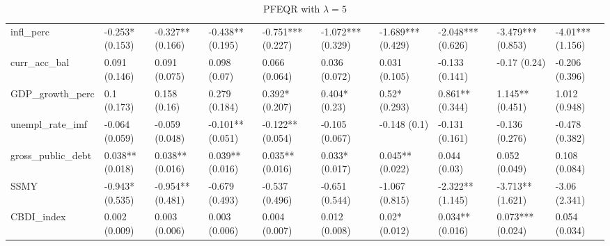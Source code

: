 \begin{table}[H]
\begin{adjustbox}{totalheight=3in, width=\columnwidth }
\begin{subtable}[c]{1.1\textwidth}
{\begin{tabular}{llllllllll}
  infl\_perc & -0.253* (0.153) & -0.327** (0.166) & -0.438** (0.195) & -0.751*** (0.227) & -1.072*** (0.329) & -1.689*** (0.429) & -2.048*** (0.626) & -3.479*** (0.853) & -4.01*** (1.156) \\ 
  curr\_acc\_bal & 0.091 (0.146) & 0.091 (0.075) & 0.098 (0.07) & 0.066 (0.064) & 0.036 (0.072) & 0.031 (0.105) & -0.133 (0.141) & -0.17 (0.24) & -0.206 (0.396) \\ 
  GDP\_growth\_perc & 0.1 (0.173) & 0.158 (0.16) & 0.279 (0.184) & 0.392* (0.207) & 0.404* (0.23) & 0.52* (0.293) & 0.861** (0.344) & 1.145** (0.451) & 1.012 (0.948) \\ 
  unempl\_rate\_imf & -0.064 (0.059) & -0.059 (0.048) & -0.101** (0.051) & -0.122** (0.054) & -0.105 (0.067) & -0.148 (0.1) & -0.131 (0.161) & -0.136 (0.276) & -0.478 (0.382) \\ 
  gross\_public\_debt & 0.038** (0.018) & 0.038** (0.016) & 0.039** (0.016) & 0.035** (0.016) & 0.033* (0.017) & 0.045** (0.022) & 0.044 (0.03) & 0.052 (0.049) & 0.108 (0.084) \\ 
  SSMY & -0.943* (0.535) & -0.954** (0.481) & -0.679 (0.493) & -0.537 (0.496) & -0.651 (0.544) & -1.067 (0.815) & -2.322** (1.145) & -3.713** (1.621) & -3.06 (2.341) \\ 
  CBDI\_index & 0.002 (0.009) & 0.003 (0.006) & 0.003 (0.006) & 0.004 (0.007) & 0.012 (0.008) & 0.02* (0.012) & 0.034** (0.016) & 0.073*** (0.024) & 0.054 (0.034) \\ 
   \bottomrule
\end{tabular}}
\end{subtable}
\end{adjustbox}
\\
\begin{adjustbox}{totalheight=3in, width=\columnwidth } 
\begin{subtable}[c]{1.1\textwidth}
\caption{PFEQR with $\lambda = 5$}
\centering
{}
\end{subtable}
\end{adjustbox}
\end{table}
